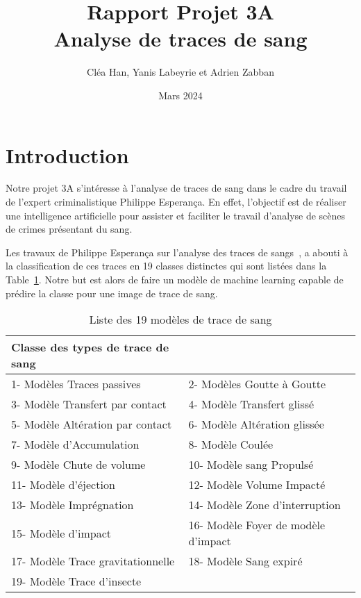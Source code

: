 \documentclass[a4paper]{article}
\title{Rapport Projet 3A \\ Analyse de traces de sang}
\author{Cléa Han, Yanis Labeyrie et Adrien Zabban}
\date{Mars 2024}
\begin{document}
\maketitle

\section{Introduction}

Notre projet 3A s'intéresse à l'analyse de traces de sang dans le cadre du travail de l'expert criminalistique Philippe Esperança. En effet, l'objectif est de réaliser une intelligence artificielle pour assister et faciliter le travail d'analyse de scènes de crimes présentant du sang. 

Les travaux de Philippe Esperança sur l'analyse  des traces de sangs~\cite{PhilippeEsperança}, a abouti à la classification de ces traces en 19 classes distinctes qui sont listées dans la Table~\ref{tab:classes}. Notre but est alors de faire un modèle de machine learning capable de prédire la classe pour une image de trace de sang.

\begin{table}[ht]
    \centering
    \begin{tabular}{|ll|}
        \hline
        \textbf{Classe des types de trace de sang} &  \\
        \hline
        1- Modèles Traces passives & 2- Modèles Goutte à Goutte \\
        3- Modèle Transfert par contact & 4- Modèle Transfert glissé \\
        5- Modèle Altération par contact & 6- Modèle Altération glissée \\
        7- Modèle d'Accumulation & 8- Modèle Coulée \\
        9- Modèle Chute de volume & 10- Modèle sang Propulsé \\
        11- Modèle d'éjection & 12- Modèle Volume Impacté \\
        13- Modèle Imprégnation & 14- Modèle Zone d'interruption \\
        15- Modèle d'impact & 16- Modèle Foyer de modèle d'impact \\
        17- Modèle Trace gravitationnelle & 18- Modèle Sang expiré \\
        19- Modèle Trace d'insecte & \\
        \hline
    \end{tabular}
    \caption{Liste des 19 modèles de trace de sang}
    \label{tab:classes}
\end{table}
\end{document}
